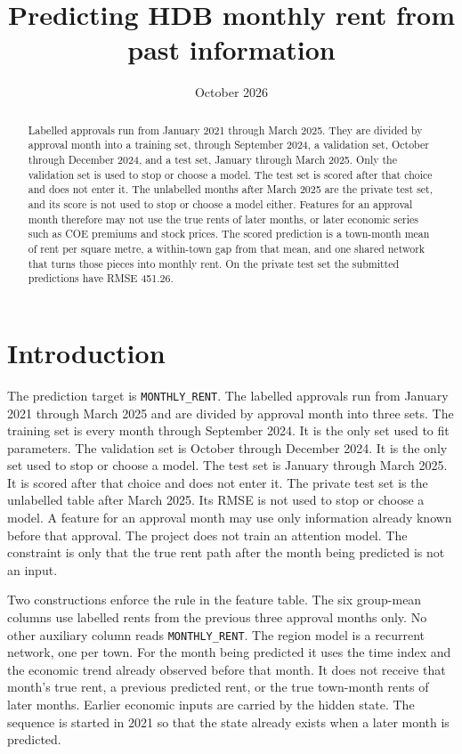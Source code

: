\documentclass[11pt]{article}
\title{Predicting HDB monthly rent from past information}
\author{}
\date{October 2026}
\begin{document}
\maketitle

\begin{abstract}
Labelled approvals run from January 2021 through March 2025.
They are divided by approval month into a training set, through September 2024, a validation set, October through December 2024, and a test set, January through March 2025.
Only the validation set is used to stop or choose a model.
The test set is scored after that choice and does not enter it.
The unlabelled months after March 2025 are the private test set, and its score is not used to stop or choose a model either.
Features for an approval month therefore may not use the true rents of later months, or later economic series such as COE premiums and stock prices.
The scored prediction is a town-month mean of rent per square metre, a within-town gap from that mean, and one shared network that turns those pieces into monthly rent.
On the private test set the submitted predictions have RMSE 451.26.
\end{abstract}

\section{Introduction}
\label{sec:intro}

The prediction target is \texttt{MONTHLY\_RENT}.
The labelled approvals run from January 2021 through March 2025 and are divided by approval month into three sets.
The training set is every month through September 2024.
It is the only set used to fit parameters.
The validation set is October through December 2024.
It is the only set used to stop or choose a model.
The test set is January through March 2025.
It is scored after that choice and does not enter it.
The private test set is the unlabelled table after March 2025.
Its RMSE is not used to stop or choose a model.
A feature for an approval month may use only information already known before that approval.
The project does not train an attention model.
The constraint is only that the true rent path after the month being predicted is not an input.

Two constructions enforce the rule in the feature table.
The six group-mean columns use labelled rents from the previous three approval months only.
No other auxiliary column reads \texttt{MONTHLY\_RENT}.
The region model is a recurrent network, one per town.
For the month being predicted it uses the time index and the economic trend already observed before that month.
It does not receive that month's true rent, a previous predicted rent, or the true town-month rents of later months.
Earlier economic inputs are carried by the hidden state.
The sequence is started in 2021 so that the state already exists when a later month is predicted.
\end{document}

